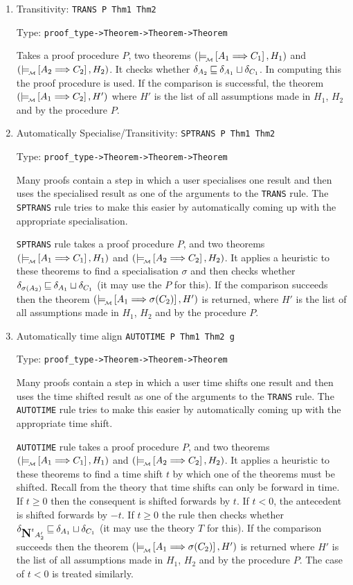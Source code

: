 \begin{enumerate}
\item Transitivity: {\tt TRANS P Thm1 Thm2}

Type: {\tt proof\_type->Theorem->Theorem->Theorem}

Takes a proof procedure $P$, two 
theorems $(\models_{\!{\mbox{}_{\cal M}}}\! \left[A_1\Longrightarrow C_1\right], H_1)$ and 
$(\models_{\!{\mbox{}_{\cal M}}}\! \left[A_2\Longrightarrow C_2\right], H_2)$. It checks
whether $\delta_{A_2} \mbox{$\: \sqsubseteq \:$} {\delta_{A_1}}\sqcup{\delta_{C_1}}$.
In computing this the proof procedure is used. If the
comparison is successful, the theorem $(\models_{\!{\mbox{}_{\cal M}}}\! \left[A_1\Longrightarrow C_2\right], H')$
where $H'$ is the list of all assumptions made in $H_1$, $H_2$
and by the procedure $P$.


\item Automatically Specialise/Transitivity: 
{\tt SPTRANS  P  Thm1 Thm2}

Type: {\tt proof\_type->Theorem->Theorem->Theorem}

Many proofs contain a step in which a user specialises 
one result and then uses the specialised result as one
of the arguments to the {\tt TRANS} rule. The {\tt SPTRANS}
rule tries to make this easier by automatically coming
up with the appropriate specialisation.

{\tt SPTRANS} rule takes a proof procedure $P$, and two theorems 
$(\models_{\!{\mbox{}_{\cal M}}}\! \left[A_1\Longrightarrow C_1\right], H_1)$ and $(\models_{\!{\mbox{}_{\cal M}}}\! \left[A_2\Longrightarrow C_2\right], H_2)$.
It applies a heuristic to these theorems to find a specialisation
$\sigma$ and then checks whether $\delta_{\sigma(A_2)}
\mbox{$\: \sqsubseteq \:$} {\delta_{A_1}}\sqcup{\delta_{C_1}}$ (it may use
the $P$ for this). If the comparison succeeds
then the theorem $(\models_{\!{\mbox{}_{\cal M}}}\! \left[A_1\Longrightarrow \sigma(C_2)\right], H')$
is returned, where $H'$ is the list of all assumptions made in $H_1$, $H_2$
and by the procedure $P$.


\item Automatically time align {\tt AUTOTIME  P Thm1  Thm2 g} 

Type: {\tt proof\_type->Theorem->Theorem->Theorem}

Many proofs contain a step in which a user time shifts
one result and then uses the time shifted result as one
of the arguments to the {\tt TRANS} rule. The {\tt AUTOTIME}
rule tries to make this easier by automatically coming
up with the appropriate time shift.

{\tt AUTOTIME} rule takes a proof procedure $P$, and two theorems 
$(\models_{\!{\mbox{}_{\cal M}}}\! \left[A_1\Longrightarrow C_1\right], H_1)$ and $(\models_{\!{\mbox{}_{\cal M}}}\! \left[A_2\Longrightarrow C_2\right], H_2)$.
It applies a heuristic to these theorems to find a time shift $t$
by which one of the theorems must be shifted. Recall from the
theory that time shifts can only be forward in time. If $t \geq 0$
then the consequent is shifted forwards by $t$. If $t < 0$, the
antecedent is shifted forwards by $-t$. If $t \geq 0$ the rule
then checks whether $\delta_{\mbox{\large\bf N}^tA'_2}
\mbox{$\: \sqsubseteq \:$} {\delta_{A_1}}\sqcup{\delta_{C_1}}$ (it may use
the theory $T$ for this). If the comparison succeeds
then the theorem $(\models_{\!{\mbox{}_{\cal M}}}\! \left[A_1\Longrightarrow \sigma(C_2)\right], H')$
is returned where $H'$ is the list of all assumptions made in $H_1$, $H_2$
and by the procedure $P$. The case of $t < 0$ is treated similarly.


\end{enumerate}
